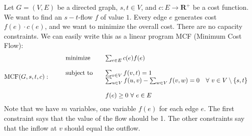 \documentclass[11pt,a4paper,oneside]{article}
\begin{document}
Let $G = (V,E)$ be a directed graph, $s,t \in V$,  and $c: E \rightarrow \mathbf{R}^+$ be a cost 
function. We want to find an $s-t$-flow $f$ of value $1$. Every edge $e$ generates cost $f(e) \cdot c(e)$, and we want to minimize the overall cost. There are no capacity constraints.
We can easily write this as a linear program MCF (Minimum Cost Flow):
\begin{align*}
  \textrm{MCF}(G,s,t,c): \qquad
  \begin{array}{ll}
    \textnormal{minimize} \quad & \multicolumn{1}{l}{\sum_{e \in E} c(e) f(e)} \\
    \\
    \textnormal{subject to} \quad & \sum_{v \in V} f(v,t)  = 1 \\
					        & \sum_{u \in V} f(u,v) - \sum_{w \in V} f(v,w)  = 0  \quad \forall\ v \in V  \setminus \{s,t\}\\
					        \\
     & f(e)  \geq 0 \ \forall \ e \in E 
  \end{array}
\end{align*}
Note that we have $m$ variables, one variable $f(e)$ for each edge $e$.
The first constraint says that the value of the flow should be 1. The other constraints say that 
the inflow at $v$ should equal the outflow.
\end{document}
